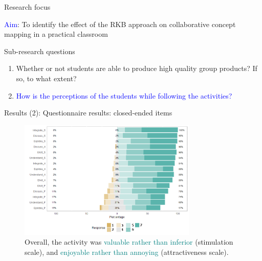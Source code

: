 \begin{frame}{Research focus}

\textcolor{blue}{Aim}:
    To identify the effect of the RKB approach on collaborative concept mapping in a practical classroom
    
\begin{block}{Sub-research questions}
    \begin{enumerate}
        \item Whether or not students are able to produce high quality group products? If so, to what extent?
        \item \textcolor{blue}{How is the perceptions of the students while following the activities?}
\end{enumerate}
\end{block}

\end{frame}

\begin{frame}{Results (2): Questionnaire results: closed-ended items}
    \begin{figure}[tb]
    \begin{center}
        \includegraphics[width=85mm]{images/rqa_questionnaire_response.png}
    \end{center}
    \caption{Overall, the activity was \textcolor{teal}{valuable rather than inferior} (stimulation scale), and \textcolor{teal}{enjoyable rather than annoying} (attractiveness scale).}  
    \end{figure}
\end{frame}

